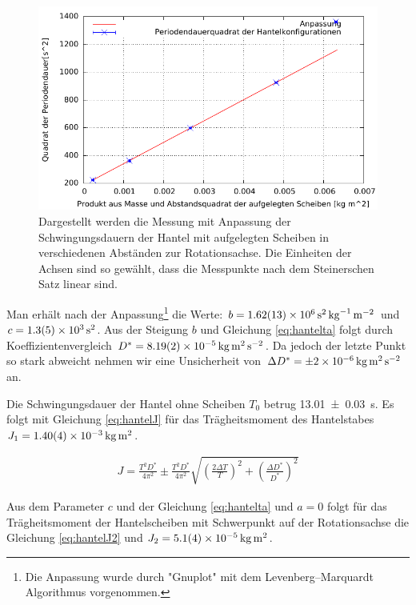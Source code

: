 \begin{figure}[h]
	\centering
	\includegraphics[width=0.7\linewidth]{auswertung/hantel/HantelF}
	\caption{Dargestellt werden die Messung mit Anpassung der Schwingungsdauern der Hantel mit aufgelegten Scheiben in verschiedenen Abständen zur Rotationsachse. Die Einheiten der Achsen sind so gewählt, dass die Messpunkte nach dem Steinerschen Satz linear sind.  }
	\label{fig:hantel}
\end{figure}

 Man erhält nach der Anpassung\footnote{Die Anpassung wurde durch "Gnuplot" mit dem Levenberg–Marquardt Algorithmus vorgenommen.  } die Werte: $ b               = \SI{1.62   \pm 0.13 e+006}{\second \squared \per \kilogram \per \metre \squared} $ und $c               = \SI{ 1.3      +-0.5e3 }   {\second \squared}$.  Aus der Steigung $b$ und Gleichung \ref{eq:hantelta} folgt durch Koeffizientenvergleich $D^*=\SI{8.19+-0.02e-5}{\kilogram \metre \squared \per \second \squared }$. Da jedoch der letzte Punkt so stark abweicht nehmen wir eine Unsicherheit von $\Delta D^*= \SI{\pm 2e-6}{\kilogram \metre \squared \per \second \squared }$ an.








Die Schwingungsdauer der Hantel ohne Scheiben $T_0$  betrug \SI{13.01 \pm 0.03}{s}. Es folgt mit Gleichung \ref{eq:hantelJ} für das Trägheitsmoment des Hantelstabes $J_1 = \SI{1.40+-0.04e-3}{\kilogram \metre \squared}$.



\begin{align}
	J=\frac{T^2 D^*}{4 \pi^2} \pm \frac{T^2 D^*}{4 \pi^2} \sqrt{
	\left(\frac{2 \Delta T}{T} \right)^2 + 	\left(\frac{\Delta D^*}{D^*} \right)^2 }
\label{eq:hantelJ}
\end{align}




Aus dem Parameter $c$ und der Gleichung \ref{eq:hantelta} und $a=0$  folgt für das Trägheitsmoment der Hantelscheiben mit Schwerpunkt auf der Rotationsachse die Gleichung \ref{eq:hantelJ2} und $J_2=\SI{5.1+-0.4e-5 }{\kilogram \metre \squared}$.


